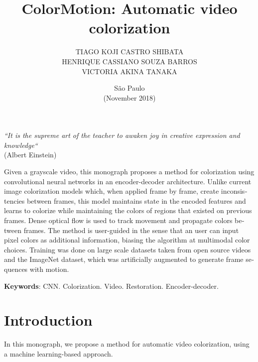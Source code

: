 \documentclass[12pt,openright,twoside,a4paper,english]{abntex2}
\author{TIAGO KOJI CASTRO SHIBATA\\
HENRIQUE CASSIANO SOUZA BARROS\\
VICTORIA AKINA TANAKA}
\title{ColorMotion: Automatic video colorization}
\date{São Paulo\\(November 2018)}
\begin{document}
\begin{otherlanguage}{english}

\imprimircapa
\imprimirfalsafolhaderosto
\imprimirfolhaderosto

\begin{epigrafe}
\begin{flushright}
\vspace*{\fill}

\textit{``It is the supreme art of the teacher to awaken joy in creative expression and knowledge``}\\
(Albert Einstein)
\par\end{flushright}\end{epigrafe}

\begin{resumo}
Given a grayscale video, this monograph proposes a method for colorization using convolutional neural networks in an encoder-decoder architecture. Unlike current image colorization models which, when applied frame by frame, create inconsistencies between frames, this model maintains state in the encoded features and learns to colorize while maintaining the colors of regions that existed on previous frames. Dense optical flow is used to track movement and propagate colors between frames. The method is user-guided in the sense that an user can input pixel colors as additional information, biasing the algorithm at multimodal color choices. Training was done on large scale datasets taken from open source videos and the ImageNet dataset, which was artificially augmented to generate frame sequences with motion.
\vspace{\onelineskip}

\noindent
\textbf{Keywords}: CNN. Colorization. Video. Restoration. Encoder-decoder.
\end{resumo}


\cleardoublepage

\tableofcontents

\maketitle

\chapter{Introduction}
In this monograph, we propose a method for automatic video colorization, using a machine learning-based approach.


\end{otherlanguage}
\end{document}
